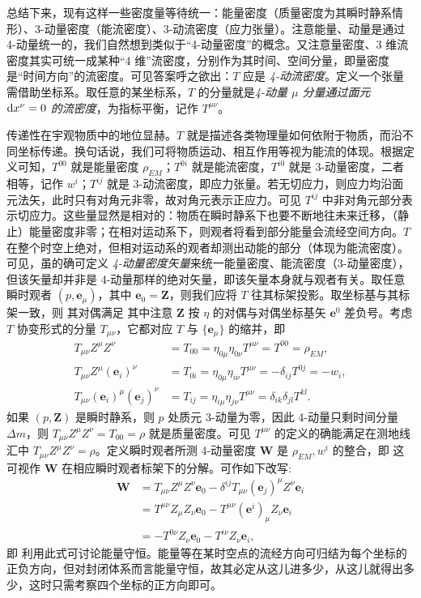 总结下来，现有这样一些密度量等待统一：能量密度（质量密度为其瞬时静系情形）、3-动量密度（能流密度）、3-动流密度（应力张量）。注意能量、动量是通过 4-动量统一的，我们自然想到类似于“4-动量密度”的概念。又注意量密度、3 维流密度其实可统一成某种“4 维”流密度，分别作为其时间、空间分量，即量密度是“时间方向”的流密度。可见答案呼之欲出：$T$ 应是 \textit{4-动流密度}。定义一个张量需借助坐标系。取任意的某坐标系，$T$ 的分量就是\textit{4-动量 $\mu$ 分量通过面元 $\dd x^\nu=0$ 的流密度}，为指标平衡，记作 $T^{\mu\nu}$。

传递性在宇观物质中的地位显赫。$T$ 就是描述各类物理量如何依附于物质，而沿不同坐标传递。换句话说，我们可将物质运动、相互作用等视为能流的体现。根据定义可知，$T^{00}$ 就是能量密度 $\rho_{EM}$；$T^{0i}$ 就是能流密度，$T^{i0}$ 就是 3-动量密度，二者相等，记作 $w^i$；$T^{ij}$ 就是 3-动流密度，即应力张量。若无切应力，则应力均沿面元法矢，此时只有对角元非零，故对角元表示正应力。可见 $T^{ij}$ 中非对角元部分表示切应力。这些量显然是相对的：物质在瞬时静系下也要不断地往未来迁移，（静止）能量密度非零；在相对运动系下，则观者将看到部分能量会流经空间方向。$T$ 在整个时空上绝对，但相对运动系的观者却测出动能的部分（体现为能流密度）。可见，虽的确可定义 \textit{4-动量密度矢量}来统一能量密度、能流密度（3-动量密度），但该矢量却并非是 4-动量那样的绝对矢量，即该矢量本身就与观者有关。取任意瞬时观者 $(p,\bm e_\mu)$，其中 $\bm e_0=\bm Z$，则我们应将 $T$ 往其标架投影。取坐标基与其标架一致，则
其对偶满足
其中注意 $\bm Z$ 按 $\eta$ 的对偶与对偶坐标基矢 $\bm e^0$ 差负号。考虑 $T$ 协变形式的分量 $T_{\mu\nu}$，它都对应 $T$ 与 $\{\bm e_\mu\}$ 的缩并，即
\begin{align}
    T_{\mu\nu}Z^\mu Z^\nu&=T_{00}=\eta_{0\mu}\eta_{0\nu}T^{\mu\nu}=T^{00}=\rho_{EM},\\ 
    T_{\mu\nu}Z^\mu(\bm e_i)^\nu&=T_{0i}=\eta_{0\mu}\eta_{i\nu}T^{\mu\nu}=-\delta_{ij}T^{0j}=-w_i,\\
    T_{\mu\nu}(\bm e_i)^\mu(\bm e_j)^\nu&=T_{ij}=\eta_{i\mu}\eta_{j\nu}T^{\mu\nu}=\delta_{ik}\delta_{jl}T^{kl}.
\end{align}
如果 $(p,\bm Z)$ 是瞬时静系，则 $p$ 处质元 3-动量为零，因此 4-动量只剩时间分量 $\Delta m$，则 $T_{\mu\nu}Z^\mu Z^\nu=T_{00}=\rho$ 就是质量密度。可见 $T^{\mu\nu}$ 的定义的确能满足在测地线汇中 $T_{\mu\nu}Z^\mu Z^\nu=\rho$。定义瞬时观者所测 4-动量密度 $\bm W$ 是 $\rho_{EM},w^i$ 的整合，即
这可视作 $\bm W$ 在相应瞬时观者标架下的分解。可作如下改写:
\begin{align*}
    \bm W
    &=T_{\mu\nu}Z^\mu Z^\nu \bm e_0-\delta^{ij}T_{\mu\nu}(\bm e_j)^\mu Z^\nu\bm e_i\\
    &=T^{\mu\nu}Z_\mu Z_\nu \bm e_0-T^{\mu\nu}(\bm e^i)_\mu Z_\nu\bm e_i\\
    &=-T^{0\nu}Z_\nu\bm e_0-T^{i\nu}Z_\nu\bm e_i,
\end{align*}
即
利用此式可讨论能量守恒。能量等在某时空点的流经方向可归结为每个坐标的正负方向，但对封闭体系而言能量守恒，故其必定从这儿进多少，从这儿就得出多少，这时只需考察四个坐标的正方向即可。

